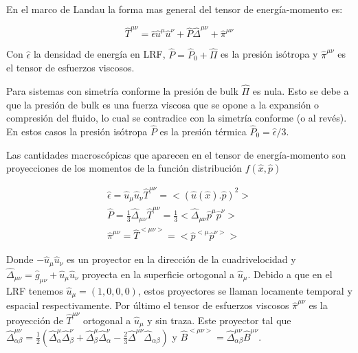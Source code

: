 \documentclass[11pt,a4paper]{article}
\begin{document}
En el marco de Landau la forma mas general del tensor de energía-momento es:

\begin{equation}
\hat{T}^{{\mu}{\nu}}= \hat{\epsilon}\hat{u}^{\mu}\hat{u}^{\nu}+\hat{P}\hat{\Delta}^{{\mu}{\nu}}+\hat{\pi}^{{\mu}{\nu}}
\label{tensor_energia_momento}
\end{equation}

Con $\hat{\epsilon}$ la densidad de energía en LRF, $\hat{P}=\hat{P}_{0}+\hat{\Pi}$ es la presión isótropa y $\hat{\pi}^{{\mu}{\nu}}$ es el tensor de esfuerzos viscosos.

Para sistemas con simetría conforme la presión de bulk $\hat{\Pi}$ es nula. Esto se debe a que la presión de bulk es una fuerza viscosa que se opone a la expansión o compresión del fluido, lo cual se contradice con la simetría conforme (o al revés). En estos casos la presión isótropa  $\hat{P}$ es la presión térmica $\hat{P}_{0}=\hat{\epsilon}/3$.

Las cantidades macroscópicas que aparecen en el tensor de energía-momento son proyecciones de los momentos de la función distribución $f( \hat{x}, \hat{p})$

\begin{subequations}
\begin{align}
\label{energia}
\hat{\epsilon}=\hat{u}_{\mu}\hat{u}_{\nu}\hat{T}^{{\mu}{\nu}}=<(\hat{u}(\hat{x}).\hat{p})^2>\\
\label{presion}
\hat{P}=\frac{1}{3}\hat{\Delta}_{{\mu}{\nu}}\hat{T}^{{\mu}{\nu}}=
\frac{1}{3}<\hat{\Delta}_{{\mu}{\nu}}\hat{p}^{\mu}\hat{p}^{\nu}>\\
\label{shear}
\hat{\pi}^{{\mu}{\nu}}= \hat{T}^{<{\mu}{\nu}>}=<\hat{p}^{<\mu}\hat{p}^{\nu>}>
\end{align}
\end{subequations}


Donde $-\hat{u}_{\mu}\hat{u}_{\nu}$ es un proyector en la dirección de la cuadrivelocidad y $\hat{\Delta}_{{\mu}{\nu}}=\hat{g}_{{\mu}{\nu}}+\hat{u}_{\mu}\hat{u}_{\nu}$  proyecta en la superficie ortogonal a $\hat{u}_{\mu}$. Debido a que en el LRF tenemos $\hat{u}_{\mu}=(1,0,0,0)$, estos proyectores se llaman locamente temporal y espacial respectivamente.
Por último el tensor de esfuerzos viscosos $\hat{\pi}^{{\mu}{\nu}}$ es la proyección de $\hat{T}^{{\mu}{\nu}}$ ortogonal a $\hat{u}_{\mu}$ y sin traza. Este proyector tal que $\hat{\Delta}^{{\mu}{\nu}}_{{\alpha}{\beta}}=\frac{1}{2}(\hat{\Delta}^{\mu}_{\alpha}\hat{\Delta}^{\nu}_{\beta}+\hat{\Delta}^{\mu}_{\beta}\hat{\Delta}^{\nu}_{\alpha}-\frac{2}{3}\hat{\Delta}^{{\mu}{\nu}}\hat{\Delta}_{{\alpha}{\beta}})$ y $\hat{B}^{<{\mu}{\nu}>}=\hat{\Delta}^{{\mu}{\nu}}_{{\alpha}{\beta}}\hat{B}^{{\mu}{\nu}}$.
\end{document}
